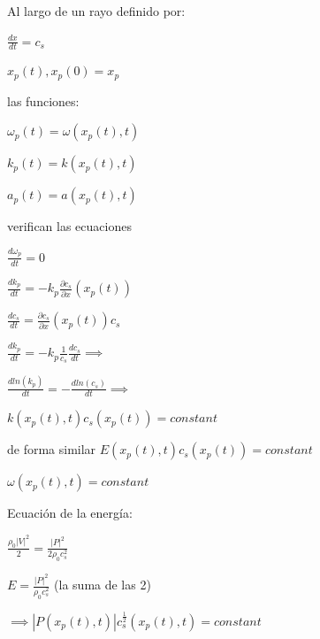 \documentclass{article}
\begin{document}
Al largo de un rayo definido por:

\begin{description}  
\item$\frac{dx}{dt} = c_s $
\item$ x_p(t) , x_p(0) = x_p $
\end{description}

las funciones:
\begin{description}  
\item $\omega_p(t) = \omega(x_p(t), t)$
\item$k_p(t) = k(x_p(t), t)$
\item$a_p(t) = a(x_p(t), t)$
\end{description}

verifican las ecuaciones
\begin{description}  
\item $\frac{d\omega_p}{dt} = 0$
\item $\frac{dk_p}{dt} = -k_p \frac{\partial c_s}{\partial x} (x_p(t))$
\item $\frac{dc_s}{dt}  =  \frac{\partial c_s}{\partial x}(x_p(t)) c_s$
\end{description}

\begin{description}  
\item $\frac{dk_p}{dt} = -k_p  \frac{1}{c_s} \frac{dc_s}{dt} \implies$
\item $\frac{dln(k_p)}{dt} = - \frac{dln(c_s)}{dt} \implies $
\item $ k(x_p(t), t)  c_s(x_p(t)) = constant $
\item de forma similar $ E(x_p(t), t)  c_s(x_p(t)) = constant $ 
\item $ \omega(x_p(t), t)  = constant $
\end{description}

Ecuación de la energía:
\begin{description}  

\item $\frac{\rho_0 |V|^{2}}{2} = \frac{|P|^{2}} {2 \rho_0 c_s^{2}} $
\item $E = \frac{|P|^{2}}{\rho_0 c_s^2} $ (la suma de las 2)
\item $\implies |P(x_p(t),t)| c_s^{\frac{1}{2}}(x_p(t),t) = constant $
\end{description}
\end{document}
